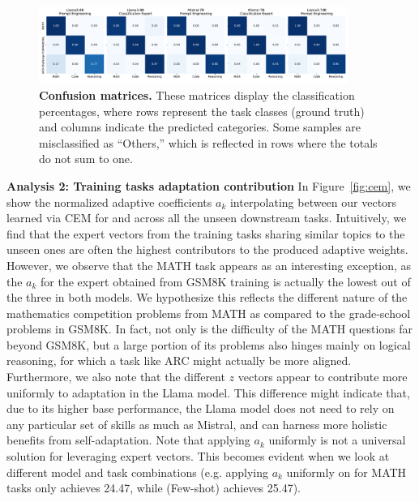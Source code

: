 \begin{figure}[t]%
    \centering
    \vspace{-0.5mm}
    \includegraphics[width=0.9\textwidth]{images/confusion_matrices.pdf}
    \vspace{-4mm}
    \caption{\textbf{Confusion matrices.} These matrices display the classification percentages, where rows represent the task classes (ground truth) and columns indicate the predicted categories. Some samples are misclassified as ``Others,'' which is reflected in rows where the totals do not sum to one.
    }
    \vspace{-10mm}
    \label{fig:confusion_matrices}
\end{figure}

\textbf{Analysis 2: Training tasks adaptation contribution}
In Figure~\ref{fig:cem}, we show the normalized adaptive coefficients $a_k$ interpolating between our \svdacro vectors learned via CEM for \llama and \mistral across all the unseen downstream tasks. 
Intuitively, we find that the expert vectors from the training tasks sharing similar topics to the unseen ones are often the highest contributors to the produced adaptive weights. 
However, we observe that the MATH task appears as an interesting exception, as the $a_k$ for the expert obtained from GSM8K training is actually the lowest out of the three in both models.
We hypothesize this reflects the different nature of the mathematics competition problems from MATH as compared to the grade-school problems in GSM8K.
In fact, not only is the difficulty of the MATH questions far beyond GSM8K, but a large portion of its problems also hinges mainly on logical reasoning, for which a task like ARC might actually be more aligned.
Furthermore, we also note that the different $z$ vectors appear to contribute more uniformly to adaptation in the Llama model.
This difference might indicate that, due to its higher base performance, the Llama model does not need to rely on any particular set of skills as much as Mistral, and can harness more holistic benefits from self-adaptation.
Note that applying $a_k$ uniformly is not a universal solution for leveraging expert vectors. This becomes evident when we look at different model and task combinations (e.g. applying $a_k$ uniformly on \llama for MATH tasks only achieves 24.47, while \implname(Few-shot) achieves 25.47).

